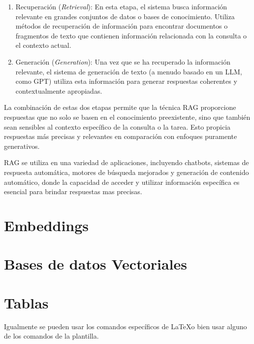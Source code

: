 \begin{enumerate}
    \item Recuperación (\textit{Retrieval}): En esta etapa, el sistema busca información relevante en grandes conjuntos de datos o bases de conocimiento. Utiliza métodos de recuperación de información para encontrar documentos o fragmentos de texto que contienen información relacionada con la consulta o el contexto actual.

    \item Generación (\textit{Generation}): Una vez que se ha recuperado la información relevante, el sistema de generación de texto (a menudo basado en un LLM, como GPT) utiliza esta información para generar respuestas coherentes y contextualmente apropiadas.
    
\end{enumerate}

La combinación de estas dos etapas permite que la técnica RAG proporcione respuestas que no solo se basen en el conocimiento preexistente\cite{chen-etal-2017-reading}, sino que también sean sensibles al contexto específico de la consulta o la tarea. Esto propicia respuestas más precisas y relevantes en comparación con enfoques puramente generativos\cite{fan-etal-2019-eli5,hossain-etal-2020-simple}.

RAG se utiliza en una variedad de aplicaciones, incluyendo chatbots, sistemas de respuesta automática, motores de búsqueda mejorados y generación de contenido automático, donde la capacidad de acceder y utilizar información específica es esencial para brindar respuestas mas precisas.

\section{Embeddings}

\section{Bases de datos Vectoriales}

\section{Tablas}

Igualmente se pueden usar los comandos específicos de \LaTeX o bien usar alguno de los comandos de la plantilla.

